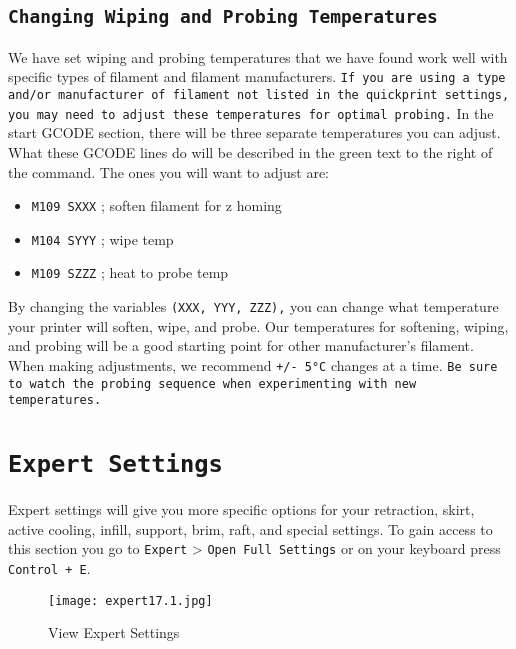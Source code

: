 \subsection{\texttt{Changing Wiping and Probing Temperatures}} \label{sssec:num1}
We have set wiping and probing temperatures that we have found work well with specific types of filament and filament manufacturers. \texttt{If you are using a type and/or manufacturer of filament not listed in the quickprint settings, you may need to adjust these temperatures for optimal probing.} In the start GCODE section, there will be three separate temperatures you can adjust. What these GCODE lines do will be described in the \textcolor{green2}{green text} to the right of the command. The ones you will want to adjust are:
\begin{itemize}
\item \texttt{M109 SXXX}                    \textcolor{green2}{; soften filament for z homing}
\item \texttt{M104 SYYY}                    \textcolor{green2}{; wipe temp}
\item \texttt{M109 SZZZ}                    \textcolor{green2}{; heat to probe temp}
\end{itemize}

By changing the variables \texttt{(XXX, YYY, ZZZ),} you can change what temperature your printer will soften, wipe, and probe. Our temperatures for softening, wiping, and probing will be a good starting point for other manufacturer's filament. When making adjustments, we recommend \texttt{+/- 5°C} changes at a time. \texttt{Be sure to watch the probing sequence when experimenting with new temperatures.}

\section{\texttt{Expert Settings}}
Expert settings will give you more specific options for your retraction, skirt, active cooling, infill, support, brim, raft, and special settings. To gain access to this section you go to \texttt{Expert} > \texttt{Open Full Settings} or on your keyboard press \texttt{Control + E}.
\begin{figure}[H]
\centering
\texttt{[image: expert17.1.jpg]}
\caption{View Expert Settings}
\label{fig:Expert Settings}
\end{figure}


